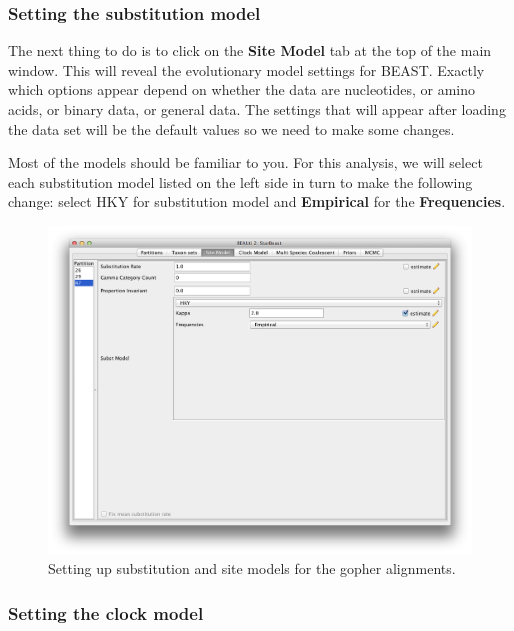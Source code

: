 \documentclass{article}
\begin{document}
\subsubsection*{Setting the substitution model}

The next thing to do is to click on the {\bf Site Model} tab at the top of the
main window. This will reveal the evolutionary model settings for
BEAST. Exactly which options appear depend on whether the data are
nucleotides, or amino acids, or binary data, or general data.
The settings that will appear after loading the data set will
be the default values so we need to make some changes. 

Most of the models should be familiar to you. For this analysis, we
will select each substitution model listed on the 
left side in turn to make the following change: select HKY for substitution model
and \textbf{Empirical} for the \textbf{Frequencies}. 
\begin{figure}
\begin{center}

\includegraphics[scale=0.4]{figures/BEAUti_Site_Model}

\end{center}
\caption{\label{fig.sitemodel} Setting up substitution and site models for the gopher alignments.}
\end{figure}


\subsubsection*{Setting the clock model}
\end{document}
